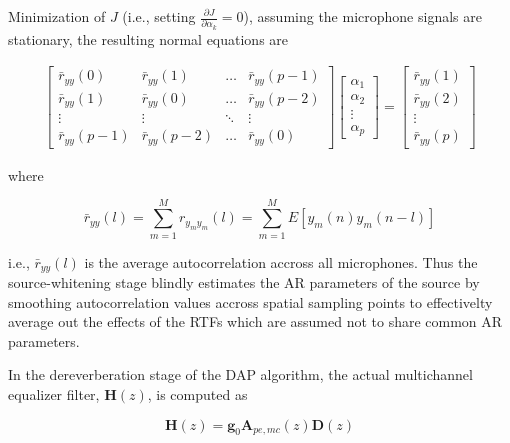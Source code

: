 Minimization of $J$ (i.e., setting $\frac{\partial J}{\partial \alpha_k} = 0$), assuming the microphone signals are stationary, the resulting normal equations are

\begin{eqnarray}
	\begin{bmatrix}
		\bar{r}_{yy}(0) & \bar{r}_{yy}(1) & \dots & \bar{r}_{yy}(p-1) \\
		\bar{r}_{yy}(1) & \bar{r}_{yy}(0) & \dots & \bar{r}_{yy}(p-2) \\
		\vdots               & \vdots              & \ddots & \vdots \\
		\bar{r}_{yy}(p-1) & \bar{r}_{yy}(p-2) & \dots & \bar{r}_{yy}(0)
	\end{bmatrix}
	\begin{bmatrix}
		\alpha_1 \\
		\alpha_2 \\
		\vdots \\
		\alpha_p
	\end{bmatrix} =
	\begin{bmatrix}
		\bar{r}_{yy}(1)  \\
		\bar{r}_{yy}(2)  \\
		\vdots \\
		\bar{r}_{yy}(p) 
	\end{bmatrix}
\end{eqnarray}

\noindent
where 

\begin{equation}
	\bar{r}_{yy}(l) = \sum_{m=1}^{M} r_{y_m y_m}(l) = \sum_{m=1}^{M} E[ y_m(n) y_m(n-l) ] \label{eq:dap_avg_autocorr}
\end{equation}

\noindent
i.e., $\bar{r}_{yy}(l)$ is the average autocorrelation accross all microphones. Thus the source-whitening stage blindly estimates the AR parameters of the source by smoothing autocorrelation values accross spatial sampling points to effectivelty average out the effects of the RTFs which are assumed not to share common AR parameters.

In the dereverberation stage of the DAP algorithm, the actual multichannel equalizer filter, $\boldsymbol{H}(z)$, is computed as 

\begin{equation}
	\boldsymbol{H}(z) = \boldsymbol{g}_0 \boldsymbol{A}_{pe,mc}(z) \boldsymbol{D}(z)
\end{equation}

